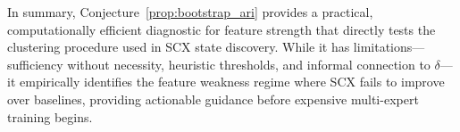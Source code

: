 In summary, Conjecture~\ref{prop:bootstrap_ari} provides a practical, computationally efficient diagnostic for feature strength that directly tests the clustering procedure used in SCX state discovery. While it has limitations---sufficiency without necessity, heuristic thresholds, and informal connection to $\delta$---it empirically identifies the feature weakness regime where SCX fails to improve over baselines, providing actionable guidance before expensive multi-expert training begins.
